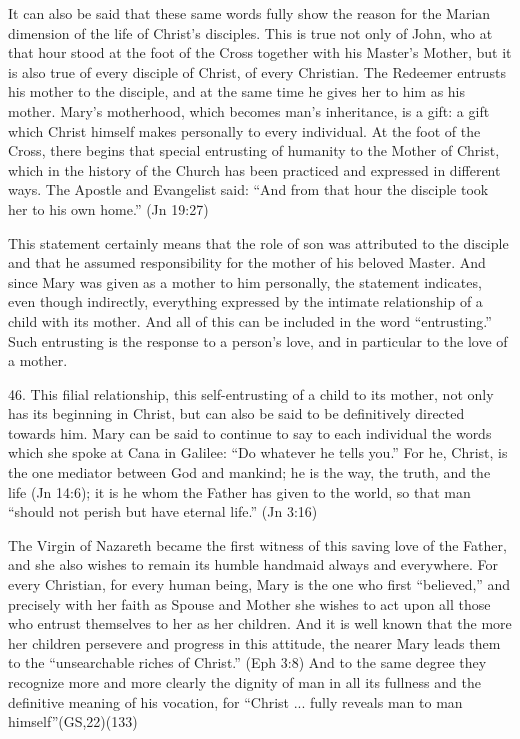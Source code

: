 \documentclass[oneside]{book}
\begin{document}
It can also be said that these same words fully show the reason for the Marian
dimension of the life of Christ's disciples. This is true not only of John, who
at that hour stood at the foot of the Cross together with his Master's Mother,
but it is also true of every disciple of Christ, of every Christian. The
Redeemer entrusts his mother to the disciple, and at the same time he gives her
to him as his mother. Mary's motherhood, which becomes man's inheritance, is a
gift: a gift which Christ himself makes personally to every individual. At the
foot of the Cross, there begins that special entrusting of humanity to the
Mother of Christ, which in the history of the Church has been practiced and
expressed in different ways. The Apostle and Evangelist said: ``And from that
hour the disciple took her to his own home.'' (Jn 19:27)

This statement certainly means that the role of son was attributed to the
disciple and that he assumed responsibility for the mother of his beloved
Master. And since Mary was given as a mother to him personally, the statement
indicates, even though indirectly, everything expressed by the intimate
relationship of a child with its mother. And all of this can be included in the
word ``entrusting.'' Such entrusting is the response to a person's love, and in
particular to the love of a mother.

46. This filial relationship, this self-entrusting of a child to its mother, not
only has its beginning in Christ, but can also be said to be definitively
directed towards him. Mary can be said to continue to say to each individual the
words which she spoke at Cana in Galilee: ``Do whatever he tells you.'' For he,
Christ, is the one mediator between God and mankind; he is the way, the truth,
and the life (Jn 14:6); it is he whom the Father has given to the world, so that
man ``should not perish but have eternal life.'' (Jn 3:16)

The Virgin of Nazareth became the first witness of this saving love of the
Father, and she also wishes to remain its humble handmaid always and
everywhere. For every Christian, for every human being, Mary is the one who
first ``believed,'' and precisely with her faith as Spouse and Mother she wishes
to act upon all those who entrust themselves to her as her children. And it is
well known that the more her children persevere and progress in this attitude,
the nearer Mary leads them to the ``unsearchable riches of Christ.'' (Eph 3:8)
And to the same degree they recognize more and more clearly the dignity of man
in all its fullness and the definitive meaning of his vocation, for ``Christ
... fully reveals man to man himself''(GS,22)(133)
\end{document}
